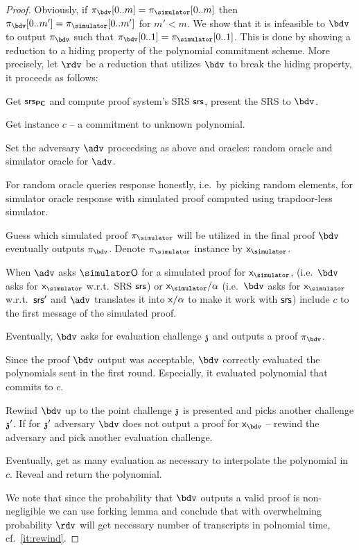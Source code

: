 \documentclass[runningheads,11pt]{llncs}
\begin{document}
\begin{proof}
  Obviously, if $\zkproofb[0..m] = \zkproofs[0..m]$ then $\zkproofb[0..m'] = \zkproofs[0..m']$ for $m' < m$. We show that it is infeasible to $\bdv$ to output $\zkproofb$ such that  $\zkproofb[0..1] = \zkproofs[0..1]$. This is done by showing a reduction to a hiding property of the polynomial commitment scheme. More precisely, let $\rdv$ be a reduction that utilizes $\bdv$ to break the hiding property, it proceeds as follows:
  \begin{compactenum}
  \item Get $\mathsf{srs}_{\bm{\mathsf{PC}}}$ and compute proof system's SRS $\mathsf{srs}$, present the SRS to $\bdv$.
  \item Get instance $c$ -- a commitment to unknown polynomial.
  \item Set the adversary $\adv$ proceedsing as above and oracles: random oracle and simulator oracle for $\adv$.
  \item For random oracle queries response honestly, i.e.~by picking random elements, for simulator oracle response with simulated proof computed using trapdoor-less simulator.
  \item Guess which simulated proof $\zkproofs$ will be utilized in the final proof $\bdv$ eventually outputs $\zkproofb$. Denote $\zkproofs$ instance by $\inps$.
  \item When $\adv$ asks $\simO$ for a simulated proof for $\inps$, (i.e.~$\bdv$ asks for $\inps$ w.r.t.~SRS $\mathsf{srs}$) or $\inps / \alpha$ (i.e.~$\bdv$ asks for $\inps$ w.r.t.~$\mathsf{srs}'$ and $\adv$ translates it into $\mathsf{x} / \alpha$ to make it work with $\mathsf{srs}$) include $c$ to the first message of the simulated proof.
  \item Eventually, $\bdv$ asks for evaluation challenge $\mathfrak{z}$ and outputs a proof $\zkproofb$.
  \item Since the proof $\bdv$ output was acceptable, $\bdv$ correctly evaluated the polynomials sent in the first round. Especially, it evaluated polynomial that commits to $c$.
  \item \label{it:rewind} Rewind $\bdv$ up to the point challenge $\mathfrak{z}$ is presented and picks another challenge $\mathfrak{z}'$. If for $\mathfrak{z}'$ adversary $\bdv$ does not output a proof for $\inpb$ -- rewind the adversary and pick another evaluation challenge.
  \item Eventually, get as many evaluation as necessary to interpolate the polynomial in $c$. Reveal and return the polynomial.
  \end{compactenum}

  We note that since the probability that $\bdv$ outputs a valid proof is non-negligible we can use forking lemma and conclude that with overwhelming probability $\rdv$ will get necessary number of transcripts in polnomial time, cf.~\cref{it:rewind}.


\end{proof}
\end{document}
